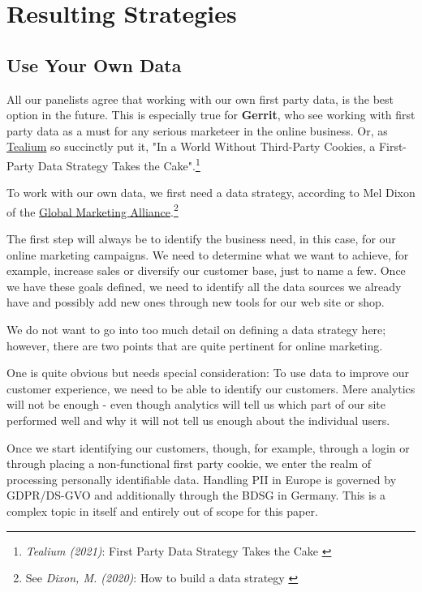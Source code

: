 %
%

\pagebreak
\section{Resulting Strategies}

\onehalfspacing

\subsection{Use Your Own Data}

All our panelists agree that working with our own first party data, is the best option in the future. This is especially true for \textbf{Gerrit}, who see working with first party data as a must for any serious marketeer in the online business. Or, as \href{https://tealium.com/}{Tealium} so succinctly put it, "In a World Without Third-Party Cookies, a First-Party Data Strategy Takes the Cake".\footnote{\textit{Tealium (2021)}: First Party Data Strategy Takes the Cake \cite{firstCake}}

To work with our own data, we first need a data strategy, according to Mel Dixon of the \href{https://www.the-gma.com/}{Global Marketing Alliance}.\footnote{See \textit{Dixon, M. (2020)}: How to build a data strategy \cite{dataStrategy}}

The first step will always be to identify the business need, in this case, for our online marketing campaigns. We need to determine what we want to achieve, for example, increase sales or diversify our customer base, just to name a few. Once we have these goals defined, we need to identify all the data sources we already have and possibly add new ones through new tools for our web site or shop.

We do not want to go into too much detail on defining a data strategy here; however, there are two points that are quite pertinent for online marketing.

One is quite obvious but needs special consideration: To use data to improve our customer experience, we need to be able to identify our customers. Mere analytics will not be enough - even though analytics will tell us which part of our site performed well and why it will not tell us enough about the individual users.

Once we start identifying our customers, though, for example, through a login or through placing a non-functional first party cookie, we enter the realm of processing personally identifiable data. Handling PII in Europe is governed by GDPR/DS-GVO and additionally through the BDSG in Germany. This is a complex topic in itself and entirely out of scope for this paper.

